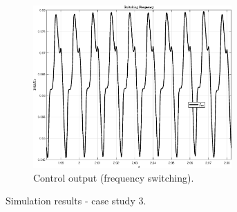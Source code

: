 \documentclass[11pt,a4paper,oneside]{book}
\numberwithin{equation}{section}
\theoremstyle{it}
\theoremstyle{definition}
\begin{document}
\begin{onehalfspace}
\begin{figure}[H]
\begin{subfigure}{0.5\textwidth}
		\includegraphics[width = 215pt, angle = 0, 
		keepaspectratio]{figures/sr_without_full_load_2/without_comp_fig_5.eps}
		\captionsetup{width=0.65\textwidth, font=footnotesize}	
		\caption{Control output (frequency switching).}
		\label{}
	\end{subfigure}
	\captionsetup{width=0.5\textwidth, font=small}	
	\caption{Simulation results - case study 3.}
	\label{}
\end{figure}


\end{onehalfspace}
\end{document}
